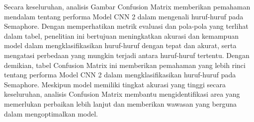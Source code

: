 Secara keseluruhan, analisis Gambar Confusion Matrix memberikan pemahaman mendalam tentang performa Model CNN 2 dalam mengenali huruf-huruf pada Semaphore. Dengan memperhatikan metrik evaluasi dan pola-pola yang terlihat dalam tabel, penelitian ini bertujuan meningkatkan akurasi dan kemampuan model dalam mengklasifikasikan huruf-huruf dengan tepat dan akurat, serta mengatasi perbedaan yang mungkin terjadi antara huruf-huruf tertentu. Dengan demikian, tabel Confusion Matrix ini memberikan pemahaman yang lebih rinci tentang performa Model CNN 2 dalam mengklasifikasikan huruf-huruf pada Semaphore. Meskipun model memiliki tingkat akurasi yang tinggi secara keseluruhan, analisis Confusion Matrix membantu mengidentifikasi area yang memerlukan perbaikan lebih lanjut dan memberikan wawasan yang berguna dalam mengoptimalkan model.

